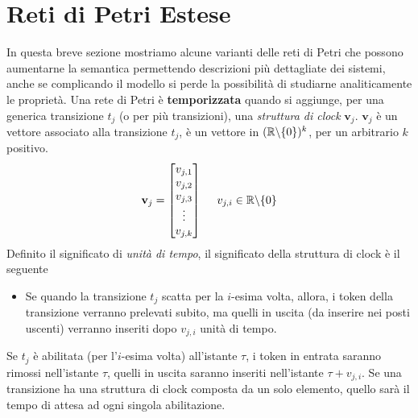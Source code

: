 \documentclass[10pt, letterpaper]{report}
\begin{document}
\section{Reti di Petri Estese}
In questa breve sezione mostriamo alcune varianti delle reti di Petri che possono aumentarne la semantica permettendo descrizioni più dettagliate dei sistemi, anche se complicando il modello si perde la possibilità di studiarne analiticamente le proprietà.\acc 
Una rete di Petri è \textbf{temporizzata} quando si aggiunge, per una generica transizione $t_j$ (o per più transizioni), una \textit{struttura di clock} $\mathbf v_j$.\acc 
$\mathbf v_j$ è un vettore associato alla transizione $t_j$, è un vettore in $({\mathbb R}\backslash\{0\})^k$, per un arbitrario $k$ positivo. 
$$ \mathbf v_j=\begin{bmatrix}
    v_{j,1}\\ 
    v_{j,2}\\ 
    v_{j,3}\\ \vdots \\ v_{j,k}
\end{bmatrix} \ \ \ \ v_{j,i}\in {\mathbb R}\backslash\{0\}$$
Definito il significato di \textit{unità di tempo}, il significato della struttura di clock è il seguente\begin{itemize}
    \item Se quando la transizione $t_j$ scatta per la $i$-esima volta, allora, i token della transizione verranno prelevati subito, ma quelli in uscita (da inserire nei posti uscenti) verranno inseriti dopo $v_{j,i}$ unità di tempo.
\end{itemize}
Se $t_j$ è abilitata (per l'$i$-esima volta) all'istante $\tau$, i token in entrata saranno rimossi nell'istante $\tau$, quelli in uscita saranno inseriti nell'istante $\tau+v_{j,i}$.
\acc 
Se una transizione ha una struttura di clock composta da un solo elemento, quello sarà il tempo di attesa ad ogni singola abilitazione. 
\end{document}
